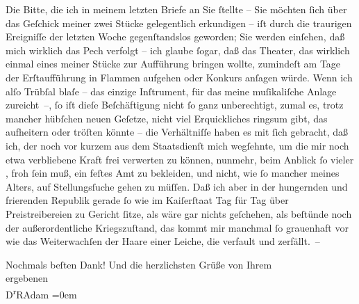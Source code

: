 \pstart
           Die Bitte, die ich in meinem letzten Briefe an Sie ſtellte – Sie möchten ſich über
               das Geſchick meiner zwei Stücke gelegentlich erkundigen – iſt durch die traurigen Ereigniſſe der
               letzten Woche gegenſtandslos geworden; Sie werden einſehen, daß mich wirklich das
               Pech verfolgt – ich glaube ſogar, daß das Theater, das wirklich einmal eines meiner
               Stücke zur Aufführung bringen wollte, zumindeſt am Tage der Erſtaufführung in Flammen
               aufgehen oder Konkurs anſagen würde. Wenn ich alſo Trübſal blaſe – das einzige
               Inſtrument, für das meine muſikaliſche Anlage zureicht –, ſo iſt dieſe Beſchäftigung
               nicht ſo ganz unberechtigt, zumal es, trotz mancher hübſchen neuen Geſetze, nicht
               viel Erquickliches ringsum gibt, das aufheitern oder tröſten könnte – die
               Verhältniſſe haben es mit ſich gebracht, daß ich, der noch vor kurzem aus dem
               Staatsdienſt mich wegſehnte, um die mir noch etwa verbliebene Kraft frei verwerten zu
               können, nunmehr, beim Anblick ſo vieler \label{K_L02315-1v}\label{K_L02315-1}, froh ſein muß, ein feſtes Amt zu bekleiden, und nicht, wie ſo
               mancher meines Alters, auf Stel{\pb}lungsſuche
               gehen zu müſſen. Daß ich aber in der hungernden und frierenden Republik gerade ſo wie im Kaiſerſtaat Tag
               für Tag über Preistreibereien zu Gericht ſitze, als wäre gar nichts geſchehen, als
               beſtünde noch der außerordentliche Kriegszuſtand, das kommt mir manchmal ſo
               grauenhaft vor wie das Weiterwachſen der Haare einer Leiche, die verfault und
               zerfällt. –\pend
           
\pstart
           Nochmals beſten Dank! Und die herzlichsten Grüße von Ihrem{\\[\baselineskip]}ergebenen{\\[\baselineskip]}\spacefill\mbox{D\textsuperscript{r}RAdam}\pend
           \leftskip=0em{}\endnumbering{}  
      